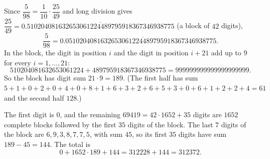 Since $\dfrac5{98}=\dfrac1{10}\cdot\dfrac{25}{49}$ and long division gives $\dfrac{25}{49}=0.\overline{510204081632653061224489795918367346938775}$ (a block of $42$ digits),
\[\dfrac5{98}=0.0\overline{510204081632653061224489795918367346938775}.\]
In the block, the digit in position $i$ and the digit in position $i+21$ add up to $9$ for every $i=1,\dots,21$:
\[510204081632653061224+489795918367346938775=999999999999999999999.\]
So the block has digit sum $21\cdot9=189$. (The first half has sum $5+1+0+2+0+4+0+8+1+6+3+2+6+5+3+0+6+1+2+2+4=61$ and the second half $128$.)

The first digit is $0$, and the remaining $69419=42\cdot1652+35$ digits are $1652$ complete blocks followed by the first $35$ digits of the block. The last $7$ digits of the block are $6,9,3,8,7,7,5$, with sum $45$, so its first $35$ digits have sum $189-45=144$. The total is
\[0+1652\cdot189+144=312228+144=\boxed{312372}.\]

